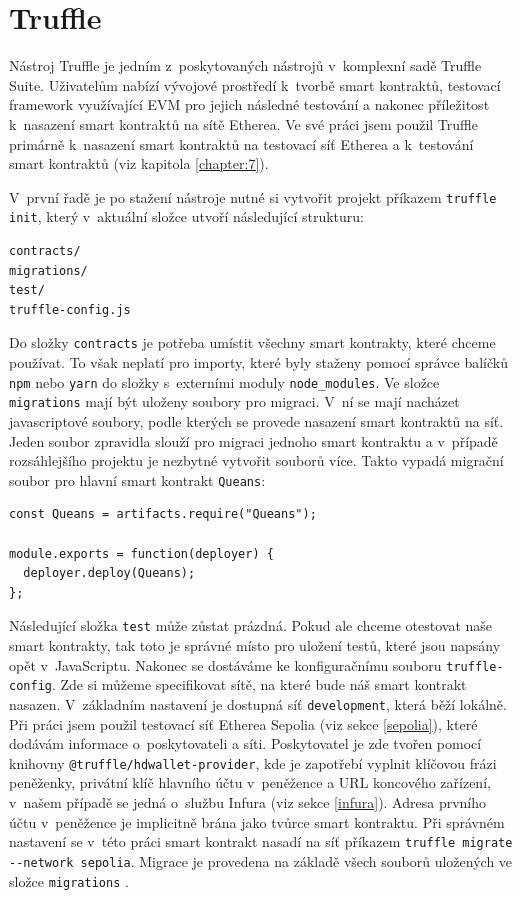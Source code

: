 \section{Truffle}
Nástroj Truffle je jedním z~poskytovaných nástrojů v~komplexní sadě Truffle Suite. Uživatelům nabízí vývojové prostředí k~tvorbě smart kontraktů, testovací framework využívající EVM pro jejich následné testování a nakonec příležitost k~nasazení smart kontraktů na sítě Etherea. Ve své práci jsem použil Truffle primárně k~nasazení smart kontraktů na testovací síť Etherea a k~testování smart kontraktů (viz kapitola \ref{chapter:7}). 

V~první řadě je po stažení nástroje nutné si vytvořit projekt příkazem \texttt{truffle init}, který v~aktuální složce utvoří následující strukturu:
\begin{verbatim}
contracts/
migrations/
test/
truffle-config.js
\end{verbatim}
Do složky \texttt{contracts} je potřeba umístit všechny smart kontrakty, které chceme používat. To však neplatí pro importy, které byly staženy pomocí správce balíčků \texttt{npm} nebo \texttt{yarn} do složky s~externími moduly \texttt{node\_modules}. Ve složce \texttt{migrations} mají být uloženy soubory pro migraci. V~ní se mají nacházet javascriptové soubory, podle kterých se provede nasazení smart kontraktů na síť. Jeden soubor zpravidla slouží pro migraci jednoho smart kontraktu a v~případě rozsáhlejšího projektu je nezbytné vytvořit souborů více. Takto vypadá migrační soubor pro hlavní smart kontrakt \texttt{Queans}:

\begin{verbatim}
const Queans = artifacts.require("Queans");

module.exports = function(deployer) {
  deployer.deploy(Queans);
};
\end{verbatim}

Následující složka \texttt{test} může zůstat prázdná. Pokud ale chceme otestovat naše smart kontrakty, tak toto je správné místo pro uložení testů, které jsou napsány opět v~JavaScriptu. Nakonec se dostáváme ke konfiguračnímu souboru \texttt{truffle-config}. Zde si můžeme specifikovat sítě, na které bude náš smart kontrakt nasazen. V~základním nastavení je dostupná síť \texttt{development}, která běží lokálně. Při práci jsem použil testovací síť Etherea Sepolia (viz sekce \ref{sepolia}), které dodávám informace o~poskytovateli a síti. Poskytovatel je zde tvořen pomocí knihovny \texttt{@truffle/hdwallet-provider}, kde je zapotřebí vyplnit klíčovou frázi peněženky, privátní klíč hlavního účtu v~peněžence a URL koncového zařízení, v~našem případě se jedná o~službu Infura (viz sekce \ref{infura}). Adresa prvního účtu v~peněžence je implicitně brána jako tvůrce smart kontraktu. Při správném nastavení se v~této práci smart kontrakt nasadí na síť příkazem \texttt{truffle migrate -{}-network sepolia}. Migrace je provedena na základě všech souborů uložených ve složce \texttt{migrations} \cite{truffle}.
